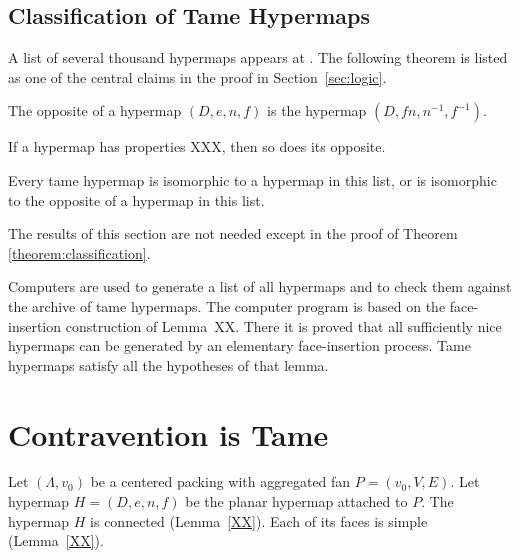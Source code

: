 \subsection{Classification of Tame Hypermaps}
    \label{sec:proof-classification}

\label{sec:classification}

A list of several thousand hypermaps appears at \cite{web}. The
following theorem is listed as one of the central claims in the
proof in Section~\ref{sec:logic}.

\begin{definition} The opposite of a hypermap $(D,e,n,f)$ is the
hypermap $(D,f n,n^{-1},f^{-1})$.
\end{definition}

\begin{lemma} If a hypermap has properties XXX, then so does its
opposite.
\end{lemma}

\begin{theorem}
\label{theorem:classification} Every tame hypermap is isomorphic to
a hypermap in this list, or is isomorphic to the opposite of a
hypermap in this list.
\end{theorem}

The results of this section are not needed except in the proof of
Theorem \ref{theorem:classification}.

\smallskip

Computers are used to generate a list of all hypermaps and to check
them against the archive of tame hypermaps.  The computer program is
based on the face-insertion construction of Lemma~XX.  There it is
proved that all sufficiently nice hypermaps can be generated by an
elementary face-insertion process.  Tame hypermaps satisfy all the
hypotheses of that lemma.





\section{Contravention is Tame}
    \label{sec:contraproof}

Let $(\Lambda,v_0)$ be a centered packing with
aggregated fan $P=(v_0,V,E)$.  Let  hypermap $H=(D,e,n,f)$
be the planar hypermap attached to $P$.
The hypermap $H$ is connected (Lemma~\ref{XX}).  Each of its
faces is simple (Lemma~\ref{XX}).

